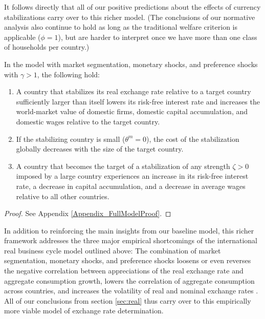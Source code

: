 \documentclass[12pt,letter]{article}
\theoremstyle{break} \theorembodyfont{\normalfont\itshape}
\theoremstyle{break}
\theoremstyle{break} \theorembodyfont{\normalfont\itshape}
\theoremstyle{break} \theorembodyfont{\normalfont\itshape}
\begin{document}
It follows directly that all of our positive predictions about the
effects of currency stabilizations carry over to this richer model.
(The conclusions of our normative analysis also continue to hold as
long as the traditional welfare criterion is applicable (\(\phi=1\)),
but are harder to interpret once we have more than one class of
households per country.)
\begin{prop}
  In the model with market segmentation, monetary shocks, and
  preference shocks with \(\gamma>1\), the following hold:
  \begin{enumerate}
  \item A country that stabilizes its real exchange rate relative to a
    target country sufficiently larger than itself lowers its
    risk-free interest rate and increases the world-market value of
    domestic firms, domestic capital accumulation, and domestic wages
    relative to the target country.
  \item If the stabilizing country is small (\(\theta^{m}=0\)), the
    cost of the stabilization globally decreases with the size of the
    target country.
  \item A country that becomes the target of a stabilization of any
    strength $\zeta > 0$ imposed by a large country experiences an
    increase in its risk-free interest rate, a decrease in capital
    accumulation, and a decrease in average wages relative to all
    other countries.
  \end{enumerate}
  \label{prop:FullModelResults}
\end{prop}
\begin{proof}
  See Appendix \ref{Appendix_FullModelProof}.
\end{proof}


In addition to reinforcing the main insights from our baseline model,
this richer framework addresses the three major empirical shortcomings
of the international real business cycle model outlined above: The
combination of market segmentation, monetary shocks, and preference
shocks loosens or even reverses the negative correlation between
appreciations of the real exchange rate and aggregate consumption
growth, lowers the correlation of aggregate consumption across
countries, and increases the volatility of real and nominal exchange
rates \citep{AlvarezAtkesonKehoe2002,PavlovaRigobon2007,Kollmann2012}.
All of our conclusions from section \ref{sec:real} thus carry over to
this empirically more viable model of exchange rate determination.
\bigskip
\end{document}
